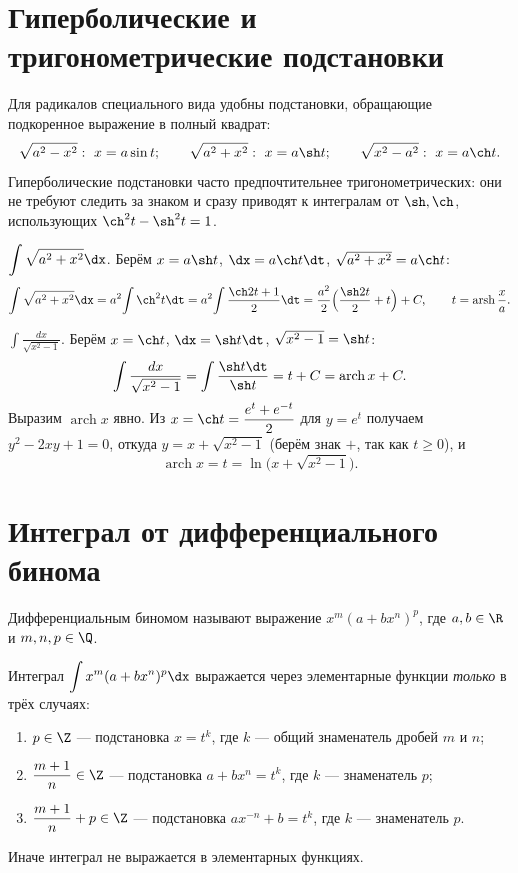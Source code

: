 \section{Гиперболические и тригонометрические подстановки}

Для радикалов специального вида удобны подстановки, обращающие подкоренное выражение в полный
квадрат:
\[
  \sqrt{a^2-x^2}:\ x=a\sin t;\qquad
  \sqrt{a^2+x^2}:\ x=a\sh t;\qquad
  \sqrt{x^2-a^2}:\ x=a\ch t .
\]
Гиперболические подстановки часто предпочтительнее тригонометрических: они не требуют следить за
знаком и сразу приводят к интегралам от $\sh,\ch$, использующих $\ch^2 t-\sh^2 t=1$.

\begin{example}
$\displaystyle\int\sqrt{a^2+x^2}\dx$. Берём $x=a\sh t$, $\dx=a\ch t\dt$, $\sqrt{a^2+x^2}=a\ch t$:
\[
  \int\sqrt{a^2+x^2}\dx=a^2\!\int\ch^2 t\dt=a^2\!\int\frac{\ch 2t+1}{2}\dt
   =\frac{a^2}{2}\Bigl(\frac{\sh 2t}{2}+t\Bigr)+C,\qquad t=\operatorname{arsh}\frac xa .
\]
\end{example}

\begin{example}
$\displaystyle\int\frac{dx}{\sqrt{x^2-1}}$. Берём $x=\ch t$, $\dx=\sh t\dt$,
$\sqrt{x^2-1}=\sh t$:
\[
  \int\frac{dx}{\sqrt{x^2-1}}=\int\frac{\sh t\dt}{\sh t}=t+C=\operatorname{arch} x+C .
\]
Выразим $\operatorname{arch} x$ явно. Из $x=\ch t=\dfrac{e^t+e^{-t}}2$ для $y=e^t$ получаем
$y^2-2xy+1=0$, откуда $y=x+\sqrt{x^2-1}$ (берём знак $+$, так как $t\ge0$), и
\[
  \operatorname{arch} x=t=\ln\bigl(x+\sqrt{x^2-1}\bigr).
\]
\end{example}

\section{Интеграл от дифференциального бинома}

Дифференциальным биномом называют выражение $x^m(a+bx^n)^p$, где $a,b\in\R$ и $m,n,p\in\Q$.

\begin{theorem}[Чебышёв]
Интеграл $\displaystyle\int x^m(a+bx^n)^p\dx$ выражается через элементарные функции \emph{только} в
трёх случаях:
\begin{enumerate}[label=\arabic*),leftmargin=*]
  \item $p\in\Z$ — подстановка $x=t^k$, где $k$ — общий знаменатель дробей $m$ и $n$;
  \item $\dfrac{m+1}{n}\in\Z$ — подстановка $a+bx^n=t^k$, где $k$ — знаменатель $p$;
  \item $\dfrac{m+1}{n}+p\in\Z$ — подстановка $ax^{-n}+b=t^k$, где $k$ — знаменатель $p$.
\end{enumerate}
Иначе интеграл не выражается в элементарных функциях.
\end{theorem}

